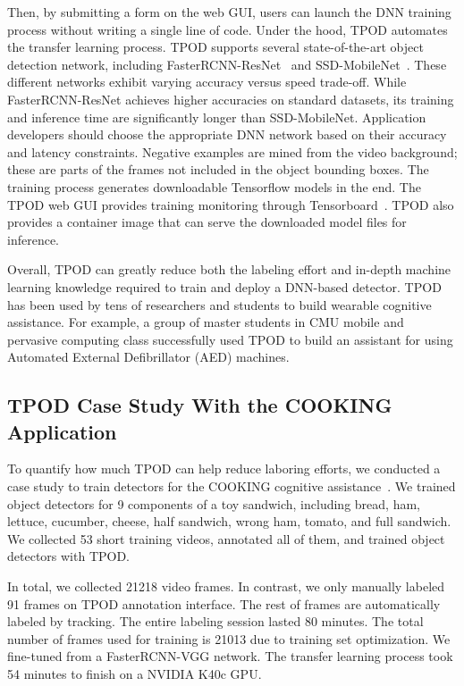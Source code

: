 Then, by submitting a form on the web GUI, users can launch the DNN training
process without writing a single line of code. Under the hood, TPOD automates
the transfer learning process. TPOD supports several state-of-the-art object
detection network, including FasterRCNN-ResNet~\cite{ren2015faster,He2016} and
SSD-MobileNet~\cite{Liu2016,Howard2017}. These different networks exhibit
varying accuracy versus speed trade-off. While FasterRCNN-ResNet achieves higher
accuracies on standard datasets, its training and inference time are
significantly longer than SSD-MobileNet. Application developers should choose
the appropriate DNN network based on their accuracy and latency constraints.
Negative examples are mined from the video background; these are parts of the
frames not included in the object bounding boxes.  The training process
generates downloadable Tensorflow models in the end. The TPOD web GUI provides
training monitoring through Tensorboard~\cite{tensorflow2017}. TPOD also
provides a container image that can serve the downloaded model files for
inference.

Overall, TPOD can greatly reduce both the labeling effort and in-depth machine
learning knowledge required to train and deploy a DNN-based detector. TPOD has
been used by tens of researchers and students to build wearable cognitive
assistance. For example, a group of master students in CMU mobile and pervasive
computing class successfully used TPOD to build an assistant for using Automated
External Defibrillator (AED) machines.

\subsection{TPOD Case Study With the COOKING Application}

To quantify how much TPOD can help reduce laboring efforts, we conducted a case
study to train detectors for the COOKING cognitive
assistance~\cite{chen2018application}. We trained object detectors for 9
components of a toy sandwich, including bread, ham, lettuce, cucumber, cheese,
half sandwich, wrong ham, tomato, and full sandwich. We collected 53 short
training videos, annotated all of them, and trained object detectors with TPOD.

In total, we collected 21218 video frames. In contrast, we only manually labeled
91 frames on TPOD annotation interface. The rest of frames are automatically
labeled by tracking. The entire labeling session lasted 80 minutes. The total
number of frames used for training is 21013 due to training set optimization. We
fine-tuned from a FasterRCNN-VGG network. The transfer learning process took 54
minutes to finish on a NVIDIA K40c GPU.


